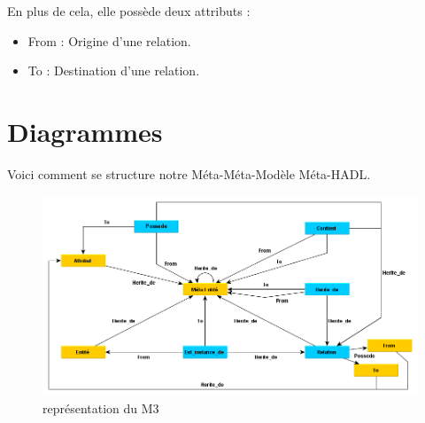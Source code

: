 			En plus de cela, elle possède deux attributs :
			\begin{itemize}
				\item From : Origine d'une relation.
				\item To : Destination d'une relation.
			\end{itemize}
			
	\section{Diagrammes}
	
		Voici comment se structure notre Méta-Méta-Modèle Méta-HADL.
	
		\begin{figure}[!h]
			\centering
			\includegraphics[scale=0.5]{../images/m3.png}
			\caption{représentation du M3}
		\end{figure}
	
\clearpage